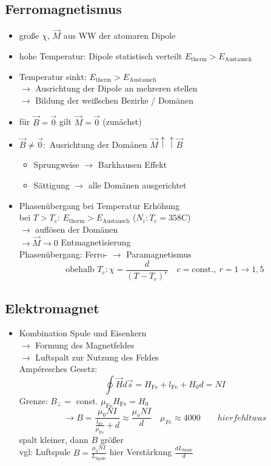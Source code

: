 \documentclass[titlepage,12pt,a4paper,ngerman]{report}
\newcommand{\tx}[1]{\textrm{#1}}
\begin{document}
\subsection{Ferromagnetismus}
\begin{itemize}
	\item große $\chi$, $\vec{M}$ aus WW der atomaren Dipole
	\item hohe Temperatur: Dipole statistisch verteilt $E_{\tx{therm}}>E_{\tx{Austausch}}$
	\item Temperatur sinkt: $E_{\tx{therm}}>E_{\tx{Austausch}}$\\
	$\rightarrow$ Ausrichtung der Dipole an mehreren stellen\\
	$\rightarrow$ Bildung der weißschen Bezirke / Domänen
	\item für $\vec{B} = \vec{0}$ gilt $ \vec{M} = \vec{0}$ (zunächst)
	\item $\vec{B} \neq \vec{0}:$ Ausrichtung der Domänen $\vec{M} \uparrow \uparrow \vec{B}$
	\begin{itemize}
		\item Sprungweise $\rightarrow$ Barkhausen Effekt
		\item Sättigung $\rightarrow$ alle Domänen ausgerichtet
	\end{itemize}
	\item Phasenübergang bei Temperatur Erhöhung\\
	bei $T>T_c$: $E_{\tx{therm}}>E_{\tx{Austausch}}$  ($N_i: T_c = 358\tx{C}$)\\
	$\rightarrow$ auflösen der Domänen\\
	$\rightarrow \vec{M} \rightarrow 0$ Entmagnetisierung\\
	Phasenübergang: Ferro- $\rightarrow$ Paramagnetismus
	$$\tx{obehalb } T_c: \chi = \frac{d}{(T-T_c)^r} \quad c = \tx{const.},\ r = 1 \rightarrow 1,5$$
\end{itemize}
\subsection{Elektromagnet}
\begin{itemize}
	\item Kombination Spule und Eisenkern\\
	$\rightarrow$ Formung des Magnetfeldes\\
	$\rightarrow$ Luftspalt zur Nutzung des Feldes\\
	Ampéresches Gesetz: $$\oint \vec{H}d\vec{s}=H_{\tx{Fe}}+l_{\tx{Fe}} + H_0d=NI$$
	Grenze: $B_\perp =$ const. $\mu_{\tx{Fe}} H_{\tx{Fe}} = H_0$\\
	$$\rightarrow B = \frac{\mu_0 N I}{\frac{l_{\tx{Fe}}}{\mu_{\tx{Fe}}}+d} \approx \frac{\mu_o NI}{d}\quad \mu_{Fe}\approx 4000 \qquad  hier fehlt was$$
	spalt kleiner, dann $B$ größer\\
	vgl: Luftspule $B= \frac{\mu_0 NI}{L_{\tx{Spule}}}$ hier Verstärkung $\frac{dL_{\tx{Spule}}}{d}$
\end{itemize}
\end{document}
